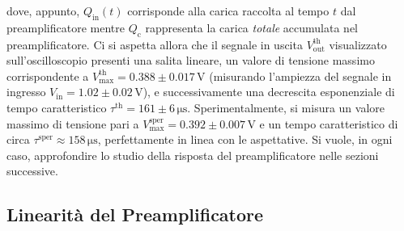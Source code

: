 \documentclass[a4paper,11pt]{article} %
\begin{document}
\noindent dove, appunto, $Q_{\text{in}} (t)$ corrisponde alla carica raccolta al tempo $t$ dal preamplificatore mentre
$Q_{\text{c}}$ rappresenta la carica \textit{totale} accumulata nel preamplificatore. Ci si aspetta allora che il
segnale in uscita $V^{\text{th}}_{\text{out}}$ visualizzato sull'oscilloscopio presenti una salita lineare, un valore di
tensione massimo corrispondente a $V_{\text{max}}^{\text{th}} = 0.388 \pm 0.017 \,\si{\volt}$ (misurando l'ampiezza del
segnale in ingresso $V_{\text{in}} = 1.02 \pm 0.02 \,\si{\volt}$), e successivamente una decrescita esponenziale di
tempo caratteristico $\tau^{\text{th}} = 161 \pm 6 \,\si{\us}$. Sperimentalmente, si misura un valore massimo
di tensione pari a $V^{\text{sper}}_{\text{max}} = 0.392 \pm 0.007 \,\si{\volt}$ e un tempo caratteristico di circa
$\tau^{\text{sper}} \approx 158 \,\si{\us}$, perfettamente in linea con le aspettative. Si vuole, in ogni caso,
approfondire lo studio della risposta del preamplificatore nelle sezioni successive. 


\subsection{Linearità del Preamplificatore}\label{s:preamp_linearity}
\end{document}
